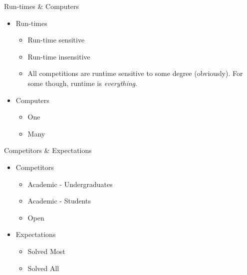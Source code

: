 \documentclass{beamer}
\begin{document}
\begin{frame}{Run-times \& Computers}
  \begin{centering}
    \begin{itemize}
      \item Run-times
      \begin{itemize}
        \item Run-time sensitive
        \item Run-time insensitive
        \item All competitions are runtime sensitive to some degree (obviously). For some though, runtime is \textit{everything}.
      \end{itemize}
      \item Computers
      \begin{itemize}
        \item One
        \item Many
      \end{itemize}
    \end{itemize}
  \end{centering}
\end{frame}

\begin{frame}{Competitors \& Expectations}
  \begin{centering}
    \begin{itemize}
      \item Competitors
      \begin{itemize}
        \item Academic - Undergraduates
        \item Academic - Students
        \item Open
      \end{itemize}
      \item Expectations
      \begin{itemize}
        \item Solved Most
        \item Solved All
      \end{itemize}
    \end{itemize}
  \end{centering}
\end{frame}
      
\end{document}
